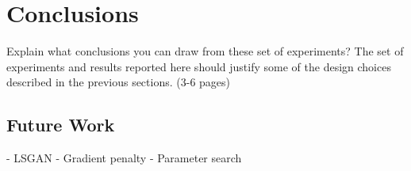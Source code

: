 
\section{Conclusions}
Explain what conclusions you can draw from these set of experiments? The set of experiments and results reported here should justify some of the design choices
described in the previous sections. (3-6 pages)


\subsection{Future Work}


- LSGAN
- Gradient penalty
- Parameter search
